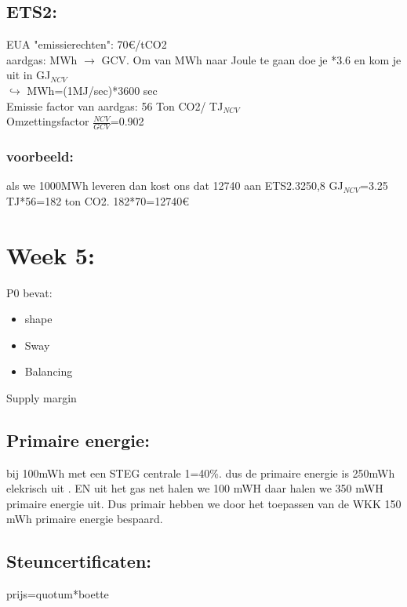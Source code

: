 \documentclass[12pt]{article}
\begin{document}
\subsection{ETS2:}
EUA "emissierechten": 70€/tCO2\\
aardgas: MWh $\rightarrow$ GCV. Om van MWh naar Joule te gaan doe je *3.6 en kom je uit in GJ$_{NCV}$\\
$\hookrightarrow$ MWh=(1MJ/sec)*3600 sec\\
Emissie factor van aardgas: 56 Ton CO2/ TJ$_{NCV}$ \\ 
Omzettingsfactor $\frac{NCV}{GCV}$=0.902\\
\subsubsection{voorbeeld:}
als we 1000MWh leveren dan kost ons dat 12740 aan ETS2.3250,8 GJ$_{NCV}$=3.25 TJ*56=182 ton CO2. 182*70=12740€
\section{Week 5:}
P0 bevat:\begin{itemize}
    \item shape 
    \item Sway 
    \item Balancing
\end{itemize}
Supply margin\\
\subsection{Primaire energie:}
bij 100mWh met een STEG centrale 1=40\%. dus de primaire energie is 250mWh elekrisch uit . EN uit het gas net halen we 100 mWH daar halen we 350 mWH primaire energie uit. Dus primair hebben we door het toepassen van de WKK 150 mWh primaire energie bespaard.
\subsection{Steuncertificaten:}
prijs=quotum*boette
\end{document}
